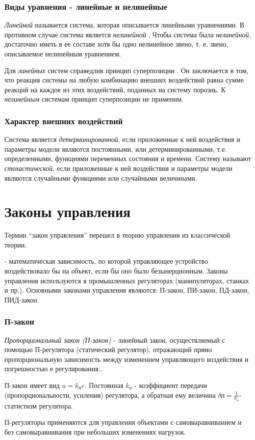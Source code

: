 \documentclass[../../TAU.tex]{subfiles}
\begin{document}
\subsubsection{Виды уравнения - линейные и нелинейные}

    {\it Линейной} называется система, которая описывается линейными уравнениями. В противном случае система является {\it нелинейной} . Чтобы система была {\it нелинейной}, достаточно иметь в ее составе хотя бы одно нелинейное звено, т. е. звено, описываемое нелинейным уравнением. \par
    Для {\it линейных} систем справедлив принцип суперпозиции . Он заключается в том, что реакция системы на любую комбинацию внешних воздействий равна сумме реакций на каждое из этих воздействий, поданных на систему порознь. К {\it нелинейным} системам принцип суперпозиции не применим. 


\subsubsection{Характер внешних воздействий}

    Система является {\it детерминированной}, если приложенные к ней воздействия и параметры модели являются постоянными, или детерминированными, т.е. определенными, функциями переменных состояния и времени. Систему называют {\it стохастической}, если приложенные к ней воздействия и параметры модели являются случайными функциями или случайными величинами.

\section{Законы управления}
    Термин “закон управления” перешел в теорию управления из классической теории. 

     - математическая зависимость, по которой управляющее устройство воздействовало бы на объект, если бы оно было безынерционным. Законы управления используются в промышленных регуляторах (манипуляторах, станках и пр.). Основными законами управления являются: П-закон, ПИ-закон, ПД-закон, ПИД-закон.

\subsubsection{П-закон}

    {\it Пропорциональный закон (П-закон)} - линейный закон, осуществляемый с помощью П-регулятора (статический регулятор), отражающий прямо пропорциональную зависимость между изменением управляющего воздействия и погрешностью $е$ регулирования.. \par
    П-закон имеет вид $u = k_{\text{п}} e$.  Постоянная $k_{\text{п}}$ - коэффициент передачи (пропорциональности, усиления) регулятора, а обратная ему величина $\delta\text{п}=\frac{1}{k_{\text{п}}}$- статистизм регулятора.  \par
    П-регуляторы применяются для управления объектами с самовыравниванием и без самовыравнивания при небольших изменениях нагрузок. 
\end{document}
